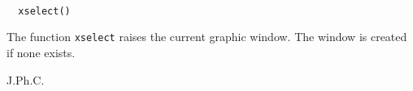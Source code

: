 \begin{mandesc}
  \\
\end{mandesc}
\begin{calling_sequence}
\begin{verbatim}
  xselect()
\end{verbatim}
\end{calling_sequence}
\begin{mandescription}
  The function \verb!xselect! raises the current graphic window.
  The window is created if none exists.
\end{mandescription}
\begin{authors}
  J.Ph.C.
\end{authors}
